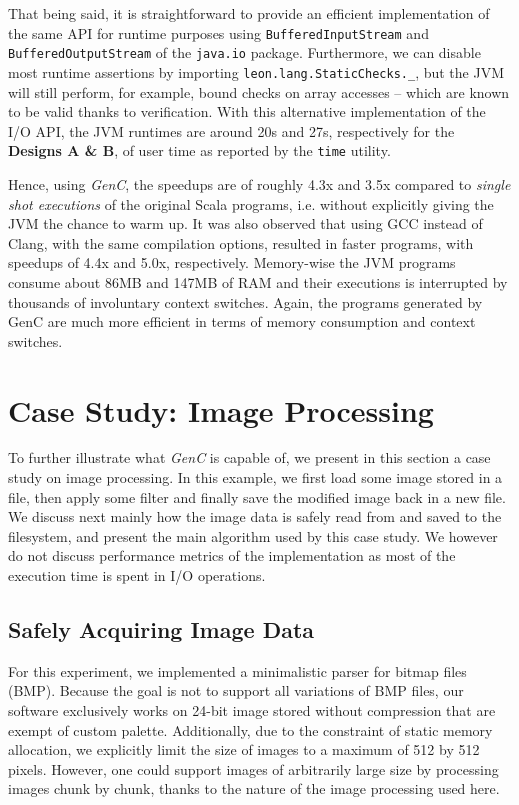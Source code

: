 \documentclass[a4paper,twoside]{article}
\newcommand{\Inline}[1]{\lstinline[basicstyle=\ttfamily]|#1|}
\newcommand{\InlineS}[1]{\lstinline[language=Leon]|#1|}
\let\oldsection\section
\renewcommand\section{\cleardoublepage\oldsection}
\newcommand{\GenC}{\emph{GenC}\xspace}
\begin{document}
That being said, it is straightforward to provide an efficient implementation of
the same API for runtime purposes using \InlineS{BufferedInputStream} and
\InlineS{BufferedOutputStream} of the \InlineS{java.io} package. Furthermore, we
can disable most runtime assertions by importing
\InlineS{leon.lang.StaticChecks._}, but the JVM will still perform, for example,
bound checks on array accesses -- which are known to be valid thanks to
verification. With this alternative implementation of the I/O API, the JVM
runtimes are around 20s and 27s, respectively for the \textbf{Designs A \& B},
of user time as reported by the \Inline{time} utility.

Hence, using \GenC, the speedups are of roughly 4.3x and 3.5x compared to
\emph{single shot executions} of the original Scala programs, i.e. without
explicitly giving the JVM the chance to warm up. It was also observed that using
GCC instead of Clang, with the same compilation options, resulted in faster
programs, with speedups of 4.4x and 5.0x, respectively. Memory-wise the JVM
programs consume about 86MB and 147MB of RAM and their executions is interrupted
by thousands of involuntary context switches.  Again, the programs generated by
GenC are much more efficient in terms of memory consumption and context
switches.


\section{Case Study: Image Processing}
\label{img_proc}

To further illustrate what \GenC is capable of, we present in this section a
case study on image processing. In this example, we first load some image stored
in a file, then apply some filter and finally save the modified image back in a
new file. We discuss next mainly how the image data is safely read from and
saved to the filesystem, and present the main algorithm used by this case study.
We however do not discuss performance metrics of the implementation as most of
the execution time is spent in I/O operations.

\subsection{Safely Acquiring Image Data}

For this experiment, we implemented a minimalistic parser for bitmap files
(BMP). Because the goal is not to support all variations of BMP files, our
software exclusively works on 24-bit image stored without compression that are
exempt of custom palette. Additionally, due to the constraint of static memory
allocation, we explicitly limit the size of images to a maximum of 512 by 512
pixels. However, one could support images of arbitrarily large size by
processing images chunk by chunk, thanks to the nature of the image processing
used here.
\end{document}
